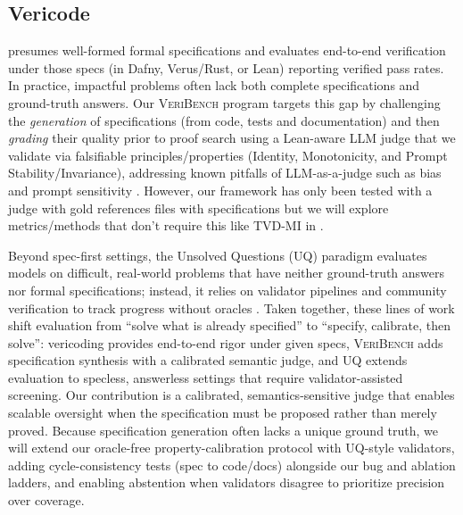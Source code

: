 \documentclass{article}
\begin{document}
\subsection{Vericode}
\citet{bursuc2025benchmarkvericodingformallyverified} presumes well-formed formal specifications and evaluates end-to-end verification under those specs (in Dafny, Verus/Rust, or Lean) reporting verified pass rates.
In practice, impactful problems often lack both complete specifications and ground-truth answers.
Our \textsc{VeriBench} program targets this gap by challenging the \emph{generation} of specifications (from code, tests and documentation) and then \emph{grading} their quality prior to proof search using a Lean-aware LLM judge that we validate via falsifiable principles/properties (Identity, Monotonicity, and Prompt Stability/Invariance), addressing known pitfalls of LLM-as-a-judge such as bias and prompt sensitivity \citep{Zheng2023MTBench,Kocmi2024HumanVsLLM,Li2024TrustLLMJudgments}.
However, our framework has only been tested with a judge with gold references files with specifications but we will explore metrics/methods that don't require this like TVD-MI in \citep{robertson2025stepbystep}.

Beyond spec-first settings, the Unsolved Questions (UQ) paradigm evaluates models on difficult, real-world problems that have neither ground-truth answers nor formal specifications; instead, it relies on validator pipelines and community verification to track progress without oracles \cite{nie2025uqassessinglanguagemodels}.
Taken together, these lines of work shift evaluation from “solve what is already specified” to “specify, calibrate, then solve”:
vericoding provides end-to-end rigor under given specs, \textsc{VeriBench} adds specification synthesis with a calibrated semantic judge, and UQ extends evaluation to specless, answerless settings that require validator-assisted screening.
Our contribution is a calibrated, semantics-sensitive judge that enables scalable oversight when the specification must be proposed rather than merely proved.
Because specification generation often lacks a unique ground truth, we will extend our oracle-free property-calibration protocol with UQ-style validators, adding cycle-consistency tests (spec to code/docs) alongside our bug and ablation ladders, and enabling abstention when validators disagree to prioritize precision over coverage.
\end{document}

